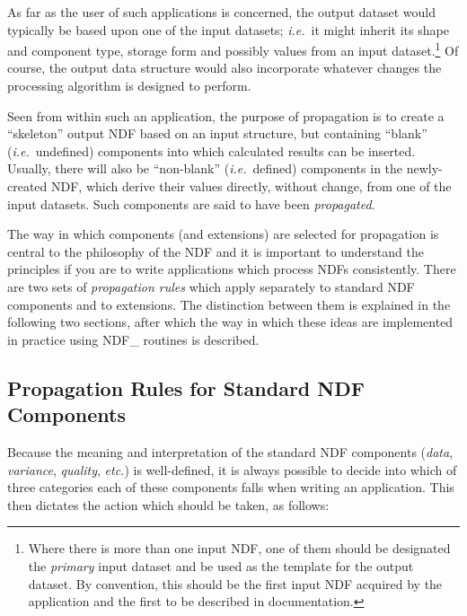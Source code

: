 \documentclass[twoside,11pt,nolof]{starlink}
\providecommand{\st}[1]{{\emph{#1}}}
\begin{document}
As far as the user of such applications is concerned, the output dataset
would typically be based upon one of the input datasets; \st{i.e.}\ it might
inherit its shape and component type, storage form and possibly values from
an input dataset.\footnote{Where there is more than one input NDF, one of
them should be designated the \st{primary\/} input dataset and be used as the
template for the output dataset. By convention, this should be the first
input NDF acquired by the application and the first to be described in
documentation.}
Of course, the output data structure would also incorporate whatever changes
the processing algorithm is designed to perform.

Seen from within such an application, the purpose of propagation is to
create a ``skeleton'' output NDF based on an input structure, but containing
``blank'' (\st{i.e.}\ undefined) components into which calculated results
can be inserted.
Usually, there will also be ``non-blank'' (\st{i.e.}\ defined) components
in the newly-created NDF, which derive their values directly, without
change, from one of the input datasets.
Such components are said to have been \st{propagated}.

The way in which components (and extensions) are selected for propagation is
central to the philosophy of the NDF and it is important to understand the
principles if you are to write applications which process NDFs consistently.
There are two sets of \st{propagation rules\/} which apply separately to
standard NDF components and to extensions.
The distinction between them is explained in the following two sections,
after which the way in which these ideas are implemented in practice using
NDF\_ routines is described.

\subsection{\label{ss:propstandard}Propagation Rules for Standard NDF Components}

Because the meaning and interpretation of the standard NDF components
(\st{data}, \st{variance}, \st{quality}, \st{etc.}) is
well-defined, it is always
possible to decide into which of three categories each of these components falls
when writing an application.
This then dictates the action which should be taken, as follows:
\end{document}
